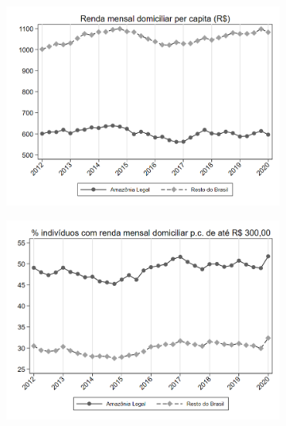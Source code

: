 \documentclass[11pt]{beamer}
\begin{document}
\begin{frame}
\begin{figure}[h!tpb]
\centering
\begin{subfigure}{.5\textwidth}
  \centering
  \includegraphics[width=.95\linewidth]{../../analysis/output/estrutura_renda/_estrutura_renda_rendimento_domiciliar_pc.png}
  \label{fig:_estrutura_renda_rendimento_domiciliar_pc}
\end{subfigure}%
\begin{subfigure}{.5\textwidth}
  \centering
  \includegraphics[width=.95\linewidth]{../../analysis/output/estrutura_renda/_estrutura_renda_prop_rendimento_domiciliar_300.png}
  \label{fig:_estrutura_renda_prop_rendimento_domiciliar_300}
\end{subfigure}


\end{figure}
\end{frame}
\end{document}
